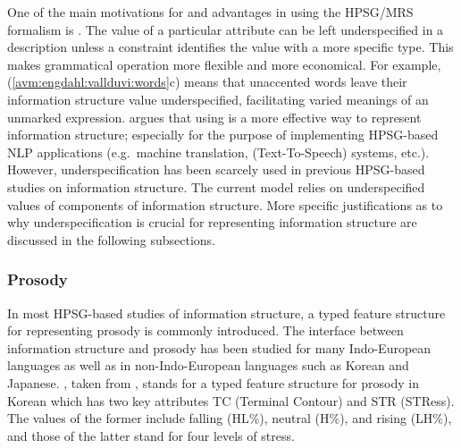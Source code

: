 One of the main motivations for and advantages in using the HPSG/MRS
formalism is .  The value of a particular
attribute can be left underspecified in a description unless a
constraint identifies the value with a more specific type.  This makes
grammatical operation more flexible and more economical. For example,
(\ref{avm:engdahl:vallduvi:words}c) means that unaccented words leave
their information structure value underspecified, facilitating varied
meanings of an unmarked expression. \citet{kuhn:96} argues
that using  is a more effective way to
represent information structure; especially for the purpose of
implementing HPSG-based NLP applications (e.g.\ machine translation,
 (Text-To-Speech) systems, etc.).  However,
underspecification has been scarcely used in previous HPSG-based
studies on information structure.  The current model relies on
underspecified values of components of information structure.  More
specific justifications as to why underspecification is crucial for
representing information structure are discussed in the following
subsections.


\subsubsection{Prosody}
\label{8:ssec:hpsg:prosody}

In most HPSG-based studies of information structure, a typed feature
structure for representing prosody is commonly introduced.
The interface between information structure and prosody has been
studied for many Indo-European languages as well as in
non-Indo-European languages such as Korean and Japanese.
, taken from \citet{chang:02}, stands for a
typed feature structure for prosody in Korean which has two key
attributes TC (Terminal Contour) and STR (STRess). The values of the
former include falling (HL\%), neutral (H\%), and rising (LH\%), and
those of the latter stand for four levels of stress.




